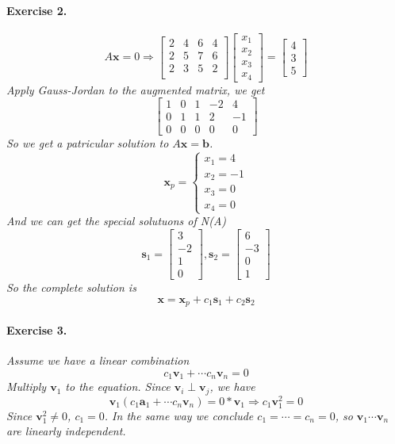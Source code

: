 \documentclass{article}
\begin{document}
\paragraph{Exercise 2.}
  \textit{
    \[
    A\mathbf{x}=0 \Rightarrow \begin{bmatrix}
        2 & 4 & 6 & 4\\
        2 & 5 & 7 & 6\\
        2 & 3 & 5 & 2\\
    \end{bmatrix}
    \begin{bmatrix}
        x_1\\x_2\\x_3\\x_4
    \end{bmatrix}
    =
    \begin{bmatrix}
        4 \\ 3 \\ 5
    \end{bmatrix}
    \]
    Apply Gauss-Jordan to the augmented matrix, we get
    \[
    \begin{bmatrix}
        1 & 0 & 1 & -2 & 4\\
        0 & 1 & 1 & 2 & -1\\
        0 & 0 & 0 & 0 & 0
    \end{bmatrix}
    \]
    So we get a patricular solution to $A\mathbf{x}=\mathbf{b}$.
    \[
    \mathbf{x}_p=
    \left\{
    \begin{aligned}
        x_1=4\\
        x_2=-1\\
        x_3=0\\
        x_4=0
    \end{aligned}
    \right.
    \]
    And we can get the special solutuons of N(A)
    \[
      \mathbf{s}_1=\begin{bmatrix}
        3 \\ -2 \\ 1 \\ 0
      \end{bmatrix} , 
      \mathbf{s}_2=\begin{bmatrix}
        6 \\ -3 \\ 0 \\ 1
      \end{bmatrix}
    \]
    So the complete solution is\[
    \mathbf{x}=\mathbf{x}_p+c_1\mathbf{s}_1+c_2\mathbf{s}_2
    \]
  }
\paragraph{Exercise 3.}
  \textit{
    Assume we have a linear combination
    \[
    c_1\mathbf{v}_1+ \cdots c_n\mathbf{v}_n=0
    \]
    Multiply $\mathbf{v}_1$ to the equation. Since $\mathbf{v}_i \perp \mathbf{v}_j$, we have
    \[
    \mathbf{v}_1(c_1\mathbf{a}_1+ \cdots c_n\mathbf{v}_n) = 0*\mathbf{v}_1 \Rightarrow c_1 \mathbf{v}^2_1 = 0
    \]
    Since $\mathbf{v}^2_1 \neq 0$, $c_1 = 0$.
    In the same way we conclude $c_1= \cdots = c_n = 0$, so $\mathbf{v}_1\cdots \mathbf{v}_n$ are linearly independent. 
  }
\end{document}
